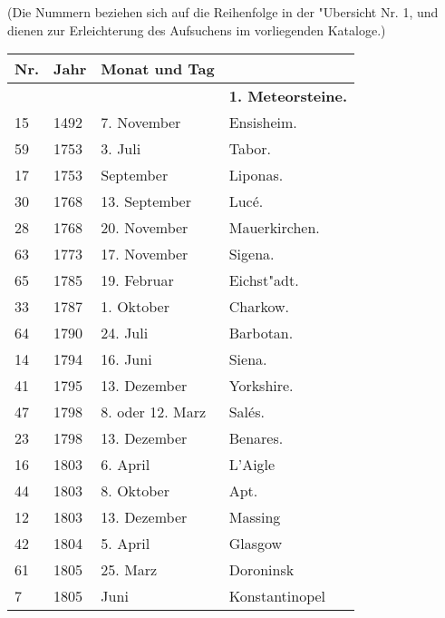\documentclass[a4paper, 11pt, oneside, polutonikogreek, german]{article}
\begin{document}
\section{}
\begin{center}

(Die Nummern beziehen sich auf die Reihenfolge in der "Ubersicht Nr. 1, und dienen zur Erleichterung des Aufsuchens im vorliegenden Kataloge.)
\end{center}
\begin{center}
    \footnotesize
    \begin{longtable}{|p{6mm}|p{9mm}|p{60mm}|p{27mm}|}
    \hline
        Nr. & Jahr & Monat und Tag &   \\ \hline
        ~ & ~ & ~ & \textbf{1. Meteorsteine.} \\ \hline
        15 & 1492 & 7. November & Ensisheim. \\ \hline
        59 & 1753 & 3. Juli & Tabor. \\ \hline
        17 & 1753 & September & Liponas. \\ \hline
        30 & 1768 & 13. September & Lucé. \\ \hline
        28 & 1768 & 20. November & Mauerkirchen. \\ \hline
        63 & 1773 & 17. November & Sigena. \\ \hline
        65 & 1785 & 19. Februar & Eichst"adt. \\ \hline
        33 & 1787 & 1. Oktober & Charkow. \\ \hline
        64 & 1790 & 24. Juli & Barbotan. \\ \hline
        14 & 1794 & 16. Juni & Siena. \\ \hline
        41 & 1795 & 13. Dezember & Yorkshire. \\ \hline
        47 & 1798 & 8. oder 12. Marz & Salés. \\ \hline
        23 & 1798 & 13. Dezember & Benares. \\ \hline
        16 & 1803 & 6. April & L’Aigle \\ \hline
        44 & 1803 & 8. Oktober & Apt. \\ \hline
        12 & 1803 & 13. Dezember & Massing \\ \hline
        42 & 1804 & 5. April & Glasgow \\ \hline
        61 & 1805 & 25. Marz & Doroninsk \\ \hline
        7 & 1805 & Juni & Konstantinopel \\ \hline

\end{longtable}
\end{center}
\end{document}
